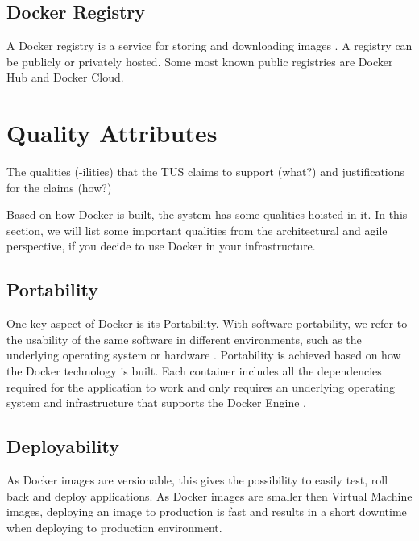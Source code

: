 \documentclass[fleqn,12pt]{olplainarticle}
\begin{document}
\subsection{Docker Registry}

A Docker registry is a service for storing and downloading images \citep{aquasec:docker_architecture}. A registry can be publicly or privately hosted. Some most known public registries are Docker Hub and Docker Cloud.

\section{Quality Attributes}

The qualities (-ilities) that the TUS claims to support (what?) and justifications for the claims (how?)

Based on how Docker is built, the system has some qualities hoisted in it. In this section, we will list some important qualities from the architectural and agile perspective, if you decide to use Docker in your infrastructure. 

\subsection{Portability}
One key aspect of Docker is its Portability. With software portability, we refer to the usability of the same software in different environments, such as the underlying operating system or hardware \citep{wiki:Software_portability}. Portability is achieved based on how the Docker technology is built. Each container includes all the dependencies required for the application to work and only requires an underlying operating system and infrastructure that supports the Docker Engine \citep{hy:DevOps_with_Docker}.

\subsection{Deployability}
As Docker images are versionable, this gives the possibility to easily test, roll back and deploy applications\citep{hentsu:benefits}. As Docker images are smaller then Virtual Machine images, deploying an image to production is fast and results in a short downtime when deploying to production environment. 
\end{document}
